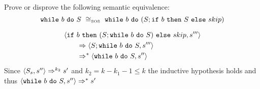 \begin{exercise}{
    Prove or disprove the following semantic equivalence:
    \[ \wwhile{b}{S}\ \SOScong\ \wwhile{b}{(S;\wif{b}{S}{skip})} \]
}
\begin{itemize}
\begin{itemize}
\begin{itemize}
\begin{itemize}
\begin{align*}
                                        &\left<\texttt{if}\ b\ \texttt{then}\ (S; \texttt{while}\ b\ \texttt{do}\ S)\ \texttt{else}\ skip, s'''\right>
                                        \\&\qquad\Rightarrow \left<S; \texttt{while}\ b\ \texttt{do}\ S, s'''\right>
                                        \\&\qquad\Rightarrow^* \left<\texttt{while}\ b\ \texttt{do}\ S, s''\right>
                                    \end{align*}
                                    Since $\left<S_s, s''\right> \Rightarrow^{k_2} s'$ and $k_2 = k - k_1 - 1 \leq k$ the inductive hypothesis holds and thus $\left<\texttt{while}\ b\ \texttt{do}\ S, s''\right> \Rightarrow^* s'$
                            \end{itemize}
                    \end{itemize}
            \end{itemize}
    \end{itemize}
\end{exercise}
